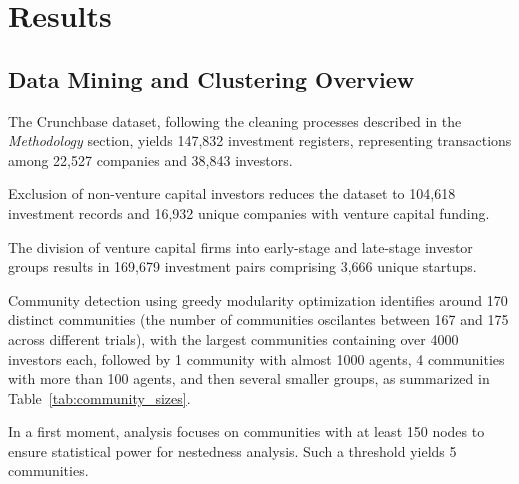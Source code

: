 \section{Results}

\subsection{Data Mining and Clustering Overview}

\newcommand{\numCompanies}{22,527}
\newcommand{\numInvestors}{38,843}
\newcommand{\numInvestments}{147,832}
\newcommand{\numFundingRounds}{268,283}

The Crunchbase dataset, following the cleaning processes described in the \textit{Methodology} section, yields \numInvestments{} investment registers, representing transactions among \numCompanies{} companies and \numInvestors{} investors.


\newcommand{\numVCInvestments}{104,618}
\newcommand{\numCompaniesWithVCFund}{16,932}

Exclusion of non-venture capital investors reduces the dataset to \numVCInvestments{} investment records and \numCompaniesWithVCFund{} unique companies with venture capital funding.

\newcommand{\invPairs}{169,679}
\newcommand{\invPairsUniqueStartups}{3,666}

The division of venture capital firms into early-stage and late-stage investor groups results in \invPairs{} investment pairs comprising \invPairsUniqueStartups{} unique startups.


\newcommand{\numCommunities}{170}
\newcommand{\numTopCommunities}{5}
\newcommand{\numCommunitiesThreshold}{150}

Community detection using greedy modularity optimization identifies around \numCommunities{} distinct communities (the number of communities oscilantes between 167 and 175 across different trials), with the largest communities containing over 4000 investors each, followed by 1 community with almost 1000 agents, 4 communities with more than 100 agents, and then several smaller groups, as summarized in Table~\ref{tab:community_sizes}.

In a first moment, analysis focuses on communities with at least \numCommunitiesThreshold{} nodes to ensure statistical power for nestedness analysis. Such a threshold yields \numTopCommunities{} communities.

